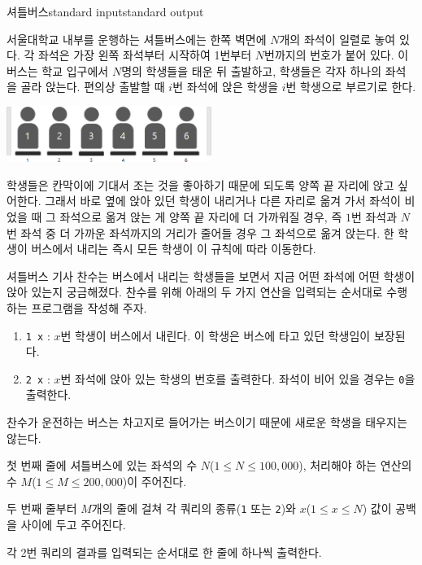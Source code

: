 \begin{problem}{셔틀버스}{standard input}{standard output}

서울대학교 내부를 운행하는 셔틀버스에는 한쪽 벽면에 $N$개의 좌석이 일렬로 놓여 있다. 각 좌석은 가장 왼쪽 좌석부터 시작하여 1번부터 $N$번까지의 번호가 붙어 있다. 이 버스는 학교 입구에서 $N$명의 학생들을 태운 뒤 출발하고, 학생들은 각자 하나의 좌석을 골라 앉는다. 편의상 출발할 때 $i$번 좌석에 앉은 학생을 $i$번 학생으로 부르기로 한다.

\begin{center}
  \includegraphics[width=0.5\textwidth]{bus1.png}
\end{center}
학생들은 칸막이에 기대서 조는 것을 좋아하기 때문에 되도록 양쪽 끝 자리에 앉고 싶어한다. 그래서 바로 옆에 앉아 있던 학생이 내리거나 다른 자리로 옮겨 가서 좌석이 비었을 때 그 좌석으로 옮겨 앉는 게 양쪽 끝 자리에 더 가까워질 경우, 즉 $1$번 좌석과 $N$번 좌석 중 더 가까운 좌석까지의 거리가 줄어들 경우 그 좌석으로 옮겨 앉는다. 한 학생이 버스에서 내리는 즉시 모든 학생이 이 규칙에 따라 이동한다.

셔틀버스 기사 찬수는 버스에서 내리는 학생들을 보면서 지금 어떤 좌석에 어떤 학생이 앉아 있는지 궁금해졌다. 찬수를 위해 아래의 두 가지 연산을 입력되는 순서대로 수행하는 프로그램을 작성해 주자.

\begin{enumerate}
\item{\texttt{1 x} : $x$번 학생이 버스에서 내린다. 이 학생은 버스에 타고 있던 학생임이 보장된다.}
\item{\texttt{2 x} : $x$번 좌석에 앉아 있는 학생의 번호를 출력한다. 좌석이 비어 있을 경우는 \texttt{0}을 출력한다.}
\end{enumerate}

찬수가 운전하는 버스는 차고지로 들어가는 버스이기 때문에 새로운 학생을 태우지는 않는다.

\InputFile
첫 번째 줄에 셔틀버스에 있는 좌석의 수 $N$($1 \le N \le 100,000$), 처리해야 하는 연산의 수 $M$($1 \le M \le 200,000$)이 주어진다.

두 번째 줄부터 $M$개의 줄에 걸쳐 각 쿼리의 종류(\texttt{1} 또는 \texttt{2})와 $x$($1 \le x \le N$) 값이 공백을 사이에 두고 주어진다.

\OutputFile
각 2번 쿼리의 결과를 입력되는 순서대로 한 줄에 하나씩 출력한다.


\end{problem}

